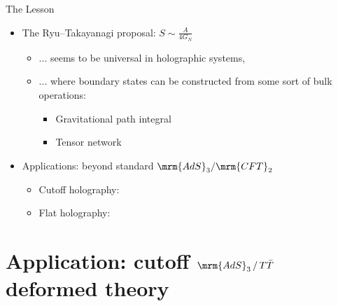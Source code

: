 \documentclass[aspectratio=169,10pt
	,noamsthm
]{beamer}
\begin{document}
\begin{frame}{The Lesson}
	\begin{itemize}\large
	\item The Ryu--Takayanagi proposal: $S \sim \frac{A}{4G_N}$
		\begin{itemize}\normalsize
		\item ... seems to be universal in holographic systems, 
		\item ... where boundary states can be constructed from some sort of bulk operations:
			\begin{itemize}
			\item Gravitational path integral
			\item Tensor network
			\end{itemize}
		\end{itemize}
	\item Applications: beyond standard $\mrm{AdS}_3/\mrm{CFT}_2$
		\begin{itemize}\normalsize
		\item Cutoff holography: \textcite{Lewkowycz:2019xse}
		\vspace{-.5ex}
		\item Flat holography: \textcite{Apolo:2020bld,Apolo:2020qjm}
		\end{itemize}
	\end{itemize}
\end{frame}


\section{Application: cutoff $\mrm{AdS}_3\,/\,T\bar{T}$ deformed theory}
\end{document}
